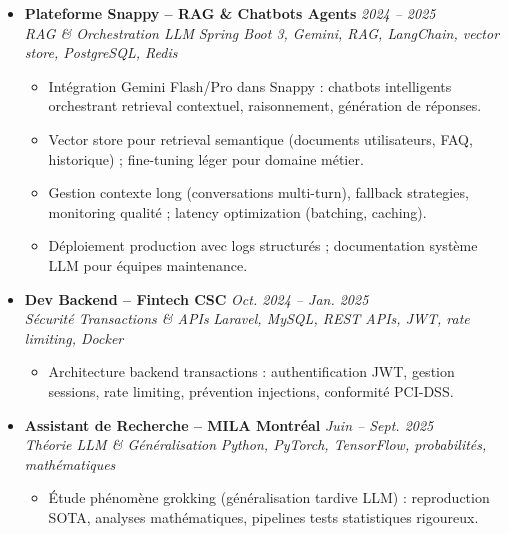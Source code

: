 \documentclass[a4paper,11pt]{article}
\begin{document}
\begin{itemize}[leftmargin=*, label={-}]
    \item \textbf{Plateforme Snappy -- RAG \& Chatbots Agents} \hfill \textit{2024 -- 2025} \\
    \textit{RAG \& Orchestration LLM} \hfill \textit{Spring Boot 3, Gemini, RAG, LangChain, vector store, PostgreSQL, Redis}
    \vspace{-2pt}
    \begin{itemize}[leftmargin=0.4cm, nosep, label=\tiny$\bullet$]
        \item \small{Intégration Gemini Flash/Pro dans Snappy : chatbots intelligents orchestrant retrieval contextuel, raisonnement, génération de réponses.}
        \item \small{Vector store pour retrieval semantique (documents utilisateurs, FAQ, historique) ; fine-tuning léger pour domaine métier.}
        \item \small{Gestion contexte long (conversations multi-turn), fallback strategies, monitoring qualité ; latency optimization (batching, caching).}
        \item \small{Déploiement production avec logs structurés ; documentation système LLM pour équipes maintenance.}
    \end{itemize}
    \vspace{3pt}

    \item \textbf{Dev Backend -- Fintech CSC} \hfill \textit{Oct. 2024 -- Jan. 2025} \\
    \textit{Sécurité Transactions \& APIs} \hfill \textit{Laravel, MySQL, REST APIs, JWT, rate limiting, Docker}
    \vspace{-2pt}
    \begin{itemize}[leftmargin=0.4cm, nosep, label=\tiny$\bullet$]
        \item \small{Architecture backend transactions : authentification JWT, gestion sessions, rate limiting, prévention injections, conformité PCI-DSS.}
    \end{itemize}
    \vspace{3pt}

    \item \textbf{Assistant de Recherche -- MILA Montréal} \hfill \textit{Juin -- Sept. 2025} \\
    \textit{Théorie LLM \& Généralisation} \hfill \textit{Python, PyTorch, TensorFlow, probabilités, mathématiques}
    \vspace{-2pt}
    \begin{itemize}[leftmargin=0.4cm, nosep, label=\tiny$\bullet$]
        \item \small{Étude phénomène grokking (généralisation tardive LLM) : reproduction SOTA, analyses mathématiques, pipelines tests statistiques rigoureux.}
    \end{itemize}
    \vspace{3pt}


\end{itemize}
\end{document}
